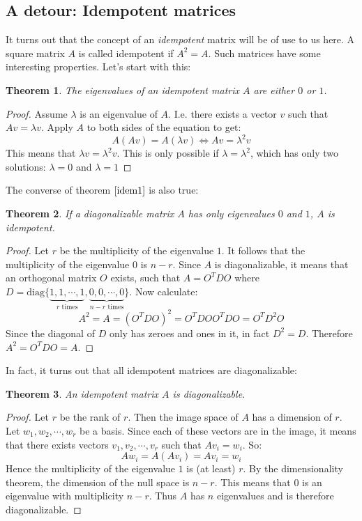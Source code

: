 \documentclass[12pt, a4paper]{article}
\newtheorem{theorem}{Theorem}
\begin{document}
\subsection{A detour: Idempotent matrices}
It turns out that the concept of an \textit{idempotent} matrix will be of use to us here. A square matrix $A$ is called idempotent if $A^2=A$. Such matrices have some interesting properties. Let's start with this:
\begin{theorem}
The eigenvalues of an idempotent matrix $A$ are either $0$ or $1$. 
\end{theorem}
\begin{proof}
\label{idem1}
Assume $\lambda$ is an eigenvalue of $A$. I.e. there exists a vector $v$ such that $Av=\lambda v$. Apply $A$ to both sides of the equation to get:
\begin{equation}
A(Av)=A(\lambda v)\Leftrightarrow Av=\lambda^2 v
\end{equation}
This means that $\lambda v=\lambda^2 v$. This is only possible if $\lambda=\lambda^2$, which has only two solutions: $\lambda=0$ and $\lambda=1$
\end{proof}

The converse of theorem $\ref{idem1}$ is also true:
\begin{theorem}
If a diagonalizable matrix $A$ has only eigenvalues $0$ and $1$, $A$ is idempotent.
\end{theorem}
\begin{proof}
Let $r$ be the multiplicity of the eigenvalue $1$. It follows that the multiplicity of the eigenvalue $0$ is $n-r$. Since $A$ is diagonalizable, it means that an orthogonal matrix $O$ exists, such that $A=O^TDO$ where $D=\textrm{diag}\{\underbrace{1, 1, \cdots, 1}_{r\textrm{ times}},\underbrace{0, 0,\cdots, 0}_{n-r\textrm{ times}}\}$. Now calculate:
\begin{equation}
A^2=A=(O^TDO)^2=O^TDOO^TDO=O^TD^2O
\end{equation}
Since the diagonal of $D$ only has zeroes and ones in it, in fact $D^2=D$. Therefore $A^2=O^TDO=A$.
\end{proof}

In fact, it turns out that all idempotent matrices are diagonalizable:

\begin{theorem}
An idempotent matrix $A$ is diagonalizable.
\end{theorem}
\begin{proof}
Let $r$ be the rank of $r$. Then the image space of $A$ has a dimension of $r$. Let ${w_1, w_2,\cdots,w_r}$ be a basis. Since each of these vectors are in the image, it means that there exists vectors $v_1, v_2,\cdots, v_r$ such that $Av_i=w_i$. So:
\begin{equation}
Aw_i=A(Av_i)=Av_i=w_i 
\end{equation}
Hence the multiplicity of the eigenvalue $1$ is (at least) $r$. By the dimensionality theorem, the dimension of the null space is $n-r$. This means that $0$ is an eigenvalue with multiplicity $n-r$. Thus $A$ has $n$ eigenvalues and is therefore diagonalizable.
\end{proof}
\end{document}
